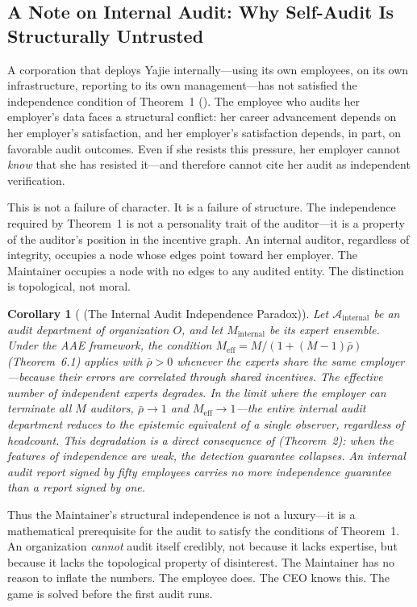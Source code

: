 \documentclass[12pt,a4paper]{article}
\newtheorem{corollary}[theorem]{Corollary}
\theoremstyle{definition}
\theoremstyle{remark}
\begin{document}
\subsection{A Note on Internal Audit: Why Self-Audit Is Structurally Untrusted}

A corporation that deploys Yajie internally—using its own employees, on its own infrastructure, reporting to its own management—has not satisfied the independence condition of Theorem~1 (). The employee who audits her employer's data faces a structural conflict: her career advancement depends on her employer's satisfaction, and her employer's satisfaction depends, in part, on favorable audit outcomes. Even if she resists this pressure, her employer cannot \textit{know} that she has resisted it—and therefore cannot cite her audit as independent verification.

This is not a failure of character. It is a failure of structure. The independence required by Theorem~1 is not a personality trait of the auditor—it is a property of the auditor's position in the incentive graph. An internal auditor, regardless of integrity, occupies a node whose edges point toward her employer. The Maintainer occupies a node with no edges to any audited entity. The distinction is topological, not moral.

\begin{corollary}[ (The Internal Audit Independence Paradox)]
\label{cor:internal-audit-paradox}
Let $\mathcal{A}_{\text{internal}}$ be an audit department of organization $O$, and let $M_{\text{internal}}$ be its expert ensemble. Under the AAE framework, the condition $M_{\text{eff}} = M/(1+(M-1)\bar{\rho})$ (Theorem~6.1) applies with $\bar{\rho} > 0$ whenever the experts share the same employer—because their errors are correlated through shared incentives. The effective number of independent experts degrades. In the limit where the employer can terminate all $M$ auditors, $\bar{\rho} \to 1$ and $M_{\text{eff}} \to 1$—the entire internal audit department reduces to the epistemic equivalent of a single observer, regardless of headcount. This degradation is a direct consequence of  (Theorem~2): when the features of independence are weak, the detection guarantee collapses. An internal audit report signed by fifty employees carries no more independence guarantee than a report signed by one.
\end{corollary}

Thus the Maintainer's structural independence is not a luxury—it is a mathematical prerequisite for the audit to satisfy the conditions of Theorem~1. An organization \textit{cannot} audit itself credibly, not because it lacks expertise, but because it lacks the topological property of disinterest. The Maintainer has no reason to inflate the numbers. The employee does. The CEO knows this. The game is solved before the first audit runs.
\end{document}
